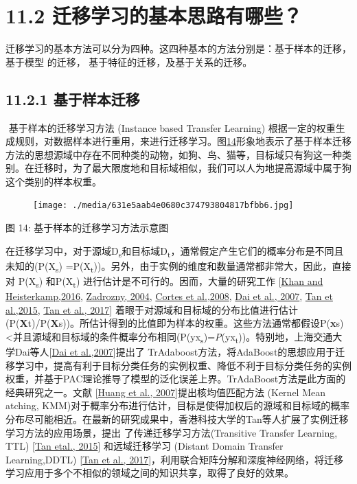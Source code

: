 \section{11.2
迁移学习的基本思路有哪些？}\label{ux8fc1ux79fbux5b66ux4e60ux7684ux57faux672cux601dux8defux6709ux54eaux4e9b}

​
迁移学习的基本方法可以分为四种。这四种基本的方法分别是：基于样本的迁移，
基于模型 的迁移， 基于特征的迁移，及基于关系的迁移。

\subsection{11.2.1
基于样本迁移}\label{ux57faux4e8eux6837ux672cux8fc1ux79fb}

​ 基于样本的迁移学习方法 (Instance based Transfer Learning)
根据一定的权重生成规则，对数据样本进行重用，来进行迁移学习。图\protect\hyperlink{bookmark90}{14}形象地表示了基于样本迁移方法的思想源域中存在不同种类的动物，如狗、鸟、猫等，目标域只有狗这一种类别。在迁移时，为了最大限度地和目标域相似，我们可以人为地提高源域中属于狗这个类别的样本权重。

\begin{figure}
\centering
\texttt{[image: ./media/631e5aab4e0680c374793804817bfbb6.jpg]}
\caption{}
\end{figure}

图 14: 基于样本的迁移学习方法示意图

​
在迁移学习中，对于源域D\textsubscript{s}和目标域D\textsubscript{t}，通常假定产生它们的概率分布是不同且未知的(P(X\textsubscript{s})
=P(X\textsubscript{t}))。另外，由于实例的维度和数量通常都非常大，因此，直接对
P(X\textsubscript{s}) 和P(X\textsubscript{t})
进行估计是不可行的。因而，大量的研究工作
{[}\protect\hyperlink{bookmark267}{Khan and Heisterkamp,2016},
\protect\hyperlink{bookmark319}{Zadrozny, 2004},
\protect\hyperlink{bookmark242}{Cortes et al.,2008},
\protect\hyperlink{bookmark243}{Dai et al., 2007},
\protect\hyperlink{bookmark302}{Tan et al.,2015},
\protect\hyperlink{bookmark303}{Tan et al., 2017}{]}
着眼于对源域和目标域的分布比值进行估计(P(\textbf{X}t)/P(\textbf{X}s))。所估计得到的比值即为样本的权重。这些方法通常都假设P(\textbf{x}s)
\textless{}并且源域和目标域的条件概率分布相同(P(y\textbar{}x\textsubscript{s})=\emph{P}(y\textbar{}x\textsubscript{t}))。特别地，上海交通大学Dai等人{[}\protect\hyperlink{bookmark243}{Dai
et al.,2007}{]}提出了
TrAdaboost方法，将AdaBoost的思想应用于迁移学习中，提高有利于目标分类任务的实例权重、降低不利于目标分类任务的实例权重，并基于PAC理论推导了模型的泛化误差上界。TrAdaBoost方法是此方面的经典研究之一。文献
{[}\protect\hyperlink{bookmark264}{Huang et al.,
2007}{]}提出核均值匹配方法 (Kernel Mean atching,
KMM)对于概率分布进行估计，目标是使得加权后的源域和目标域的概率分布尽可能相近。在最新的研究成果中，香港科技大学的Tan等人扩展了实例迁移学习方法的应用场景，提出
了传递迁移学习方法(Transitive Transfer Learning, TTL)
{[}\protect\hyperlink{bookmark302}{Tan etal., 2015}{]} 和远域迁移学习
(Distant Domain Transfer Learning,DDTL)
{[}\protect\hyperlink{bookmark303}{Tan et al.,
2017}{]}，利用联合矩阵分解和深度神经网络，将迁移学习应用于多个不相似的领域之间的知识共享，取得了良好的效果。

